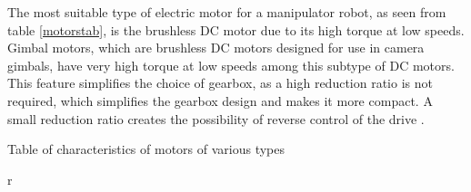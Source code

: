 The most suitable type of electric motor for a manipulator robot, as seen from table \ref{motorstab}, is the brushless DC motor due to its high torque at low speeds. Gimbal motors, which are brushless DC motors designed for use in camera gimbals, have very high torque at low speeds among this subtype of DC motors. This feature simplifies the choice of gearbox, as a high reduction ratio is not required, which simplifies the gearbox design and makes it more compact. A small reduction ratio creates the possibility of reverse control of the drive \citep{8867893}.

\begin{table}[H]
	\centering
	\caption{Table of characteristics of motors of various types}\label{motorstab}
	\begin{adjustbox}{width={\textwidth}}

		r


\end{adjustbox}
\end{table}
